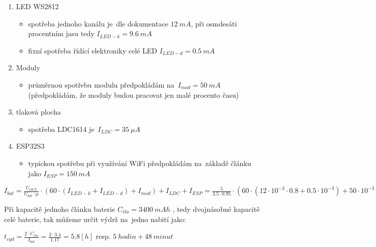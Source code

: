 \begin{enumerate}
    \item LED WS2812 \cite{WS2812B-cinsky}
    \begin{itemize}
        \item spotřeba jednoho kanálu je~dle dokumentace \(12~mA\), při osmdesáti procentním jasu tedy \(I_{LED-k} = 9.6~mA\)
        \item fixní spotřeba řídící elektroniky celé LED \(I_{LED-d} = 0.5~mA\)
    \end{itemize}
    \item Moduly 
    \begin{itemize}
        \item průměrnou spotřebu modulu předpokládám na~\(I_{mod} = 50~mA\) (předpokládám, že moduly budou pracovat jen malé procento času) 
    \end{itemize}
    \item tlaková plocha
    \begin{itemize}
        \item spotřeba LDC1614 je~\(I_{LDC} = 35~\mu A\) \cite{LDC1614}
    \end{itemize}
    \item ESP32S3
    \begin{itemize}
        \item typickou spotřebu při využívání WiFi předpokládám na~základě článku \cite{spotreba-ESP32S3} jako \(I_{ESP} = 150~mA\)
    \end{itemize}
\end{enumerate}

\vspace{5mm}
\large
\begin{centering}
\(
    I_{bat} = \frac{U_{OUT}}{U_{bat} \cdot \mu} \cdot (60 \cdot (I_{LED-k} + I_{LED-d}) + I_{mod}) + I_{LDC} + I_{ESP} = 
    \frac{5}{3.5 \cdot 0.95} \cdot (60 \cdot (12\cdot10^{-3} \cdot 0.8 + 0.5\cdot10^{-3}) + 50\cdot10^{-3}) + 35\cdot10^{-3} + 150\cdot10^{-3} = 1.17~[A]
\)
\end{centering}
\normalsize
\vspace{1mm}

Při kapacitě jednoho článku baterie \(C_{čla} = 3400~mAh\) \cite{kapacita-18650}, tedy dvojnásobné kapacitě celé baterie, tak můžeme určit výdrž na~jedno nabití jako:

\vspace{3mm}
\large
\( t_{vyd} = \frac{2 \cdot C_{čla}}{I_{bat}} = \frac{2 \cdot 3.4}{1.17} = 5.8 [h] \)  \normalsize resp. \( 5~hodin + 48~minut \)
\vspace{3mm}


